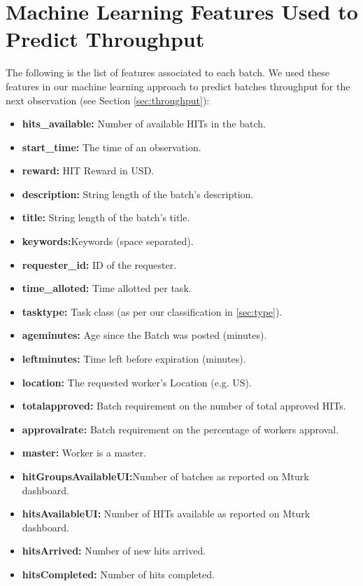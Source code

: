 \appendix

\label{ap:feats}
\section{Machine Learning Features Used to Predict Throughput}
The following is the list of features associated to each batch. We used these features in our machine learning approach to predict batches throughput for the next observation (see Section \ref{sec:throughput}):
\begin{itemize}[noitemsep]
\item \textbf{hits\_available:} Number of available HITs in the batch.
\item \textbf{start\_time:} The time of an observation.
\item \textbf{reward:} HIT Reward in USD.
\item \textbf{description:} String length of the batch's description.
\item \textbf{title:} String length of the batch's title.
\item \textbf{keywords:}Keywords (space separated).
\item \textbf{requester\_id:} ID of the requester.
\item \textbf{time\_alloted:} Time allotted per task.
\item \textbf{tasktype:} Task class (as per our classification in \ref{sec:type}).
\item \textbf{ageminutes:} Age since the Batch was posted (minutes).
\item \textbf{leftminutes:} Time left before expiration (minutes).
\item \textbf{location:} The requested worker's Location (e.g. US).
\item \textbf{totalapproved:} Batch requirement on the number of total approved HITs.
\item \textbf{approvalrate:} Batch requirement on the percentage of workers approval.
\item \textbf{master:} Worker is a master.
\item \textbf{hitGroupsAvailableUI:}Number of batches as reported on Mturk dashboard.
\item \textbf{hitsAvailableUI:} Number of HITs available as reported on Mturk dashboard.
\item \textbf{hitsArrived:} Number of new hits arrived.
\item \textbf{hitsCompleted:} Number of hits completed.

\end{itemize}
